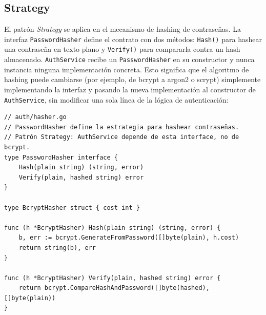 \documentclass[12pt,a4paper]{article}
\begin{document}
\subsection{Strategy}

El patrón \emph{Strategy} se aplica en el mecanismo de hashing de contraseñas. La interfaz
\texttt{PasswordHasher} define el contrato con dos métodos: \texttt{Hash()} para hashear una
contraseña en texto plano y \texttt{Verify()} para compararla contra un hash almacenado. \texttt{AuthService} recibe un \texttt{PasswordHasher} en su constructor y nunca instancia
ninguna implementación concreta. Esto significa que el algoritmo de hashing puede cambiarse
(por ejemplo, de bcrypt a argon2 o scrypt) simplemente implementando la interfaz y pasando la
nueva implementación al constructor de \texttt{AuthService}, sin modificar una sola línea de
la lógica de autenticación:

\begin{lstlisting}[style=gostyle]
// auth/hasher.go
// PasswordHasher define la estrategia para hashear contraseñas.
// Patrón Strategy: AuthService depende de esta interface, no de bcrypt.
type PasswordHasher interface {
    Hash(plain string) (string, error)
    Verify(plain, hashed string) error
}

type BcryptHasher struct { cost int }

func (h *BcryptHasher) Hash(plain string) (string, error) {
    b, err := bcrypt.GenerateFromPassword([]byte(plain), h.cost)
    return string(b), err
}

func (h *BcryptHasher) Verify(plain, hashed string) error {
    return bcrypt.CompareHashAndPassword([]byte(hashed), []byte(plain))
}
\end{lstlisting}

\begin{center}
\end{center}
\end{document}
